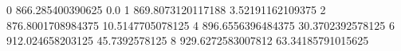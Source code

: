 0 866.285400390625 0.0
1 869.8073120117188 3.52191162109375
2 876.8001708984375 10.5147705078125
4 896.6556396484375 30.3702392578125
6 912.024658203125 45.7392578125
8 929.6272583007812 63.34185791015625

